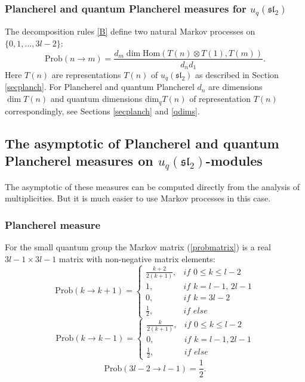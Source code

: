 \documentclass[11pt]{amsart}
\newcommand\lie[1]{\mathfrak{#1}}
\begin{document}
\subsubsection{Plancherel and quantum Plancherel measures for $u_q(\lie{sl}_2)$}
The decomposition rules \ref{B} define two natural Markov processes on $\{0,1,\ldots,3l-2\}$:
\begin{equation}\label{probmatrix}
\mathrm{Prob}(n\to m)=\frac{d_m \dim\mathrm{Hom}(T(n)\otimes T(1),T(m))}{d_n d_1}.
\end{equation}
Here $T(n)$ are representations $T(n)$ of $u_q(\lie{sl}_2)$ as described in Section \ref{secplanch}. For Plancherel and quantum Plancherel $d_n$ are dimensions $\dim T(n)$ and quantum dimensions $\mathrm{dim}_q T(n)$ of representation $T(n)$ correspondingly, see Sections \ref{secplanch} and \ref{qdims}.



\subsection{The asymptotic of Plancherel and quantum Plancherel measures on $u_q(\lie{sl}_2)$-modules}\label{markovuq}
The asymptotic of these measures can be computed directly from the analysis of multiplicities. But it is much easier to use Markov processes in this case.

\subsubsection{Plancherel measure}
For the small quantum group the Markov matrix (\ref{probmatrix}) is a real $3l-1\times 3l-1$ matrix
with non-negative matrix elements:
\begin{equation*}
\mathrm{Prob}(k\to k+1)=\begin{cases}
\frac{k+2}{2(k+1)},&\textit{if $0\leq k \leq l-2$}\\
1,&\textit{if $k=l-1$, $2l-1$}\\
0,&\textit{if $k=3l-2$}\\
\frac{1}{2},&\textit{if else}
\end{cases}
\end{equation*}
\begin{equation*}
\mathrm{Prob}(k\to k-1)=\begin{cases}
\frac{k}{2(k+1)},&\textit{if $0\leq k \leq l-2$}\\
0,&\textit{if $k=l-1, 2l-1$}\\
\frac{1}{2},&\textit{if else}
\end{cases}
\end{equation*}
\begin{equation*}
\mathrm{Prob}(3l-2\to l-1)=\frac{1}{2}.
\end{equation*}
\end{document}
